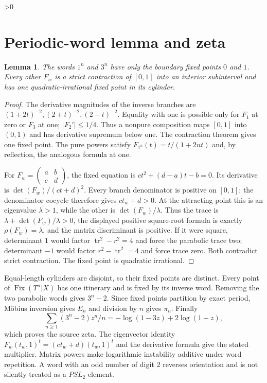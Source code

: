 \documentclass[10pt]{article}
\newtheorem{lemma}{Lemma}
\providecommand{\CRevisionRound}{2}
\newcommand{\Fix}{\operatorname{Fix}}
\begin{document}
\ifnum\CRevisionRound>0
\section{Periodic-word lemma and zeta}
\begin{lemma}
The words $1^n$ and $3^n$ have only the boundary fixed points $0$ and $1$.
Every other $F_w$ is a strict contraction of $[0,1]$ into an interior
subinterval and has one quadratic-irrational fixed point in its cylinder.
\end{lemma}
\begin{proof}
The derivative magnitudes of the inverse branches are
$(1+2t)^{-2},(2+t)^{-2},(2-t)^{-2}$.  Equality with one is possible only for
$F_1$ at zero or $F_3$ at one; $|F_2'|\le1/4$.  Thus a nonpure composition
maps $[0,1]$ into $(0,1)$ and has derivative supremum below one.  The
contraction theorem gives one fixed point.  The pure powers satisfy
$F_{1^n}(t)=t/(1+2nt)$ and, by reflection, the analogous formula at one.

For $F_w=(\begin{smallmatrix}a&b\\c&d\end{smallmatrix})$, the fixed equation
is $ct^2+(d-a)t-b=0$.  Its derivative is
$\det(F_w)/(ct+d)^2$.  Every branch denominator is positive on $[0,1]$;
the denominator cocycle therefore gives $ct_w+d>0$.  At the attracting point
this is an eigenvalue $\lambda>1$, while the other is
$\det(F_w)/\lambda$.  Thus the trace is
$\lambda+\det(F_w)/\lambda>0$, the displayed positive square-root formula is
exactly $\rho(F_w)=\lambda$, and the matrix discriminant is positive.  If it
were square, determinant $1$ would
factor $\operatorname{tr}^2-r^2=4$ and force the parabolic trace two;
determinant $-1$ would factor $r^2-\operatorname{tr}^2=4$ and force trace
zero.  Both contradict strict contraction.  The fixed point is quadratic
irrational.
\end{proof}

Equal-length cylinders are disjoint, so their fixed points are distinct.
Every point of $\Fix(T^n|X)$ has one itinerary and is fixed by its inverse
word.  Removing the two parabolic words gives $3^n-2$.  Since fixed points
partition by exact period, M\"obius inversion gives $E_n$ and division by $n$
gives $\pi_n$.  Finally
\[
 \sum_{n\ge1}(3^n-2)z^n/n=-\log(1-3z)+2\log(1-z),
\]
which proves the source zeta.  The eigenvector identity
$F_w(t_w,1)^t=(ct_w+d)(t_w,1)^t$ and the derivative formula give the stated
multiplier.  Matrix powers make logarithmic instability additive under word
repetition.  A word with an odd number of digit $2$ reverses orientation and
is not silently treated as a $PSL_2$ element.
\fi
\end{document}
